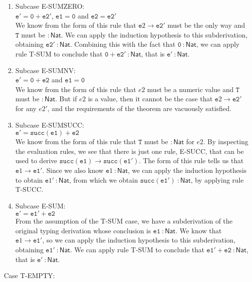 \documentclass[a4paper]{article}
\begin{document}
\begin{enumerate}
\item Subcase E-SUMZERO:\\
$\mathtt {e' = 0 + e2'}$, $\mathtt {e1 = 0}$ and $\mathtt {e2 = e2'}$\\
We know from the form of this rule that $\mathtt e2 \rightarrow \mathtt{e2'}$ must be the only way and $\mathtt T$ must be $\mathsf { : Nat}$. We can apply the induction hypothesis to this subderivation, obtaining $\mathtt{e2'}~\mathsf{ : Nat}$. Combining this with the fact that $\mathtt{0}~\mathsf{ : Nat}$, we can apply rule T-SUM to conclude that $\mathtt {0 + e2'}~\mathsf{ : Nat}$, that is $\mathtt {e'}~\mathsf{ : Nat}$.
\item Subcase E-SUMNV:\\
$\mathtt {e' = 0 + e2}$ and $\mathtt {e1 = 0}$\\
We know from the form of this rule that $e2$ must be a numeric value and $\mathtt T$ must be $\mathsf { : Nat}$. But if $e2$ is a value, then it cannot be the case that $\mathtt e2 \rightarrow \mathtt{e2'}$ for any $e2'$, and the requirements of the theorem are vacuously satisfied.
\item Subcase E-SUMSUCC:\\
$\mathtt {e' = succ(e1) + e2}$\\
We know from the form of this rule that $\mathtt T$ must be $\mathsf { : Nat}$ for $e2$. By inspecting the evaluation rules, we see that there is just one rule, E-SUCC, that can be used to derive $\mathtt {succ(e1)} \rightarrow \mathtt{succ(e1')}$. The form of this rule tells us that $\mathtt e1 \rightarrow \mathtt{e1'}$. Since we also know $\mathtt e1 ~\mathsf {: Nat}$, we can apply the induction hypothesis to obtain $\mathtt e1' ~\mathsf {: Nat}$, from which we obtain $\mathtt {succ(e1')} ~\mathsf {: Nat}$, by applying rule T-SUCC.
\item Subcase E-SUM:\\
$\mathtt {e' = e1' + e2}$\\
From the assumption of the T-SUM case, we have a subderivation of the original typing derivation whose conclusion is $\mathtt{e1}~\mathsf{ : Nat}$. We know that $\mathtt e1 \rightarrow \mathtt{e1'}$, so we can apply the induction hypothesis to this subderivation, obtaining $\mathtt{e1'}~\mathsf{ : Nat}$. We can apply rule T-SUM to conclude that $\mathtt {e1' + e2}~\mathsf{ : Nat}$, that is $\mathtt {e'}~\mathsf{ : Nat}$.
\end{enumerate}
Case T-EMPTY:\\
\end{document}
